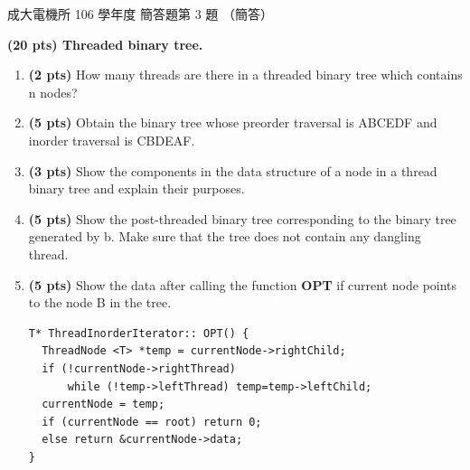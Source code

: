 \begin{pastexam}[label={px:ncku-106-ee-ds-07}]{成大電機所 106 學年度 簡答題第 3 題}
（簡答）

\textbf{(20 pts) Threaded binary tree.}
\begin{enumerate}[label=\alph*.]
\item \textbf{(2 pts)} How many threads are there in a threaded binary tree which contains n nodes?
\item \textbf{(5 pts)} Obtain the binary tree whose preorder traversal is ABCEDF and inorder traversal is CBDEAF.
\item \textbf{(3 pts)} Show the components in the data structure of a node in a thread binary tree and explain
their purposes.
\item \textbf{(5 pts)} Show the post-threaded binary tree corresponding to the binary tree generated by b. Make
sure that the tree does not contain any dangling thread.
\item \textbf{(5 pts)} Show the data after calling the function \textbf{OPT} if current node points to the node B
in the tree.
\begin{verbatim}
T* ThreadInorderIterator:: OPT() {
  ThreadNode <T> *temp = currentNode->rightChild;
  if (!currentNode->rightThread)
      while (!temp->leftThread) temp=temp->leftChild;
  currentNode = temp;
  if (currentNode == root) return 0;
  else return &currentNode->data;
}
\end{verbatim}
\end{enumerate}
\end{pastexam}

